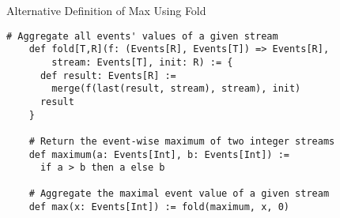 \begin{frame}[fragile]{Alternative Definition of Max Using Fold}
  \scriptsize
  \begin{lstlisting}[gobble=4,language=tessla]
    # Aggregate all events' values of a given stream
    def fold[T,R](f: (Events[R], Events[T]) => Events[R],
        stream: Events[T], init: R) := {
      def result: Events[R] :=
        merge(f(last(result, stream), stream), init)
      result
    }

    # Return the event-wise maximum of two integer streams
    def maximum(a: Events[Int], b: Events[Int]) :=
      if a > b then a else b
  
    # Aggregate the maximal event value of a given stream
    def max(x: Events[Int]) := fold(maximum, x, 0)
  \end{lstlisting}
\end{frame}
